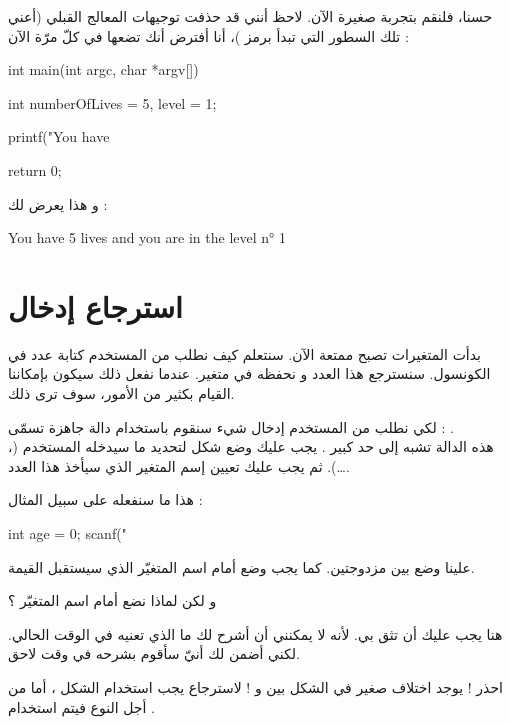 حسنا، فلنقم بتجربة صغيرة الآن. لاحظ أنني قد حذفت توجيهات المعالج القبلي (أعني تلك السطور التي تبدأ برمز
\InlineCode{\#})،
أنا أفترض أنك تضعها في كلّ مرّة الآن :

\begin{Csource}
int main(int argc, char *argv[])
{
  int numberOfLives = 5, level = 1;

  printf("You have %

  return 0;
}
\end{Csource}

و هذا يعرض لك :

\begin{Console}
You have 5 lives and you are in the level n° 1
\end{Console}

\section{استرجاع إدخال}

بدأت المتغيرات تصبح ممتعة الآن. سنتعلم كيف نطلب من المستخدم كتابة عدد في الكونسول. سنسترجع هذا العدد و نحفظه في متغير. عندما نفعل ذلك سيكون بإمكاننا القيام بكثير من الأمور، سوف ترى ذلك.

لكي نطلب من المستخدم إدخال شيء سنقوم باستخدام دالة جاهزة تسمّى :
.\\
هذه الدالة تشبه إلى حد كبير
.
يجب عليك وضع شكل لتحديد ما سيدخله المستخدم
(،  \dots).
ثم يجب عليك تعيين إسم المتغير الذي سيأخذ هذا العدد.

هذا ما سنفعله على سبيل المثال :

\begin{Csource}
int age = 0;
scanf("%
\end{Csource}

علينا وضع
بين مزدوجتين. كما يجب وضع
\InlineCode{\&}
أمام اسم المتغيّر الذي سيستقبل القيمة.

\begin{question}
  و لكن لماذا نضع
\InlineCode{\&}
أمام اسم المتغيّر ؟
\end{question}

هنا يجب عليك أن تثق بي. لأنه لا يمكنني أن أشرح لك ما الذي تعنيه في الوقت الحالي. لكني أضمن لك أنيّ سأقوم بشرحه في وقت لاحق.

\begin{critical}
احذر ! يوجد اختلاف صغير في الشكل بين
و
 ! لاسترجاع
يجب استخدام الشكل
،
أما من أجل النوع
 فيتم استخدام
.
\end{critical}

